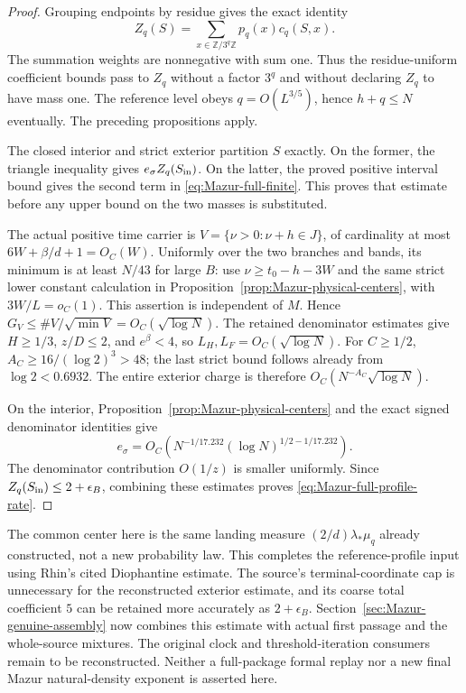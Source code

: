 \begin{proof}
Grouping endpoints by residue gives the exact identity
\[
 Z_q(S)=\sum_{x\in\mathbb Z/3^q\mathbb Z}p_q(x)c_q(S,x).
\]
The summation weights are nonnegative with sum one. Thus the
residue-uniform coefficient bounds pass to $Z_q$ without a factor
$3^q$ and without declaring $Z_q$ to have mass one.
The reference level obeys $q=O(L^{3/5})$, hence $h+q\le N$
eventually. The preceding propositions apply.

The closed interior and strict exterior partition $S$ exactly.
On the former, the triangle inequality gives $e_\sigma Z_q(S_{\rm in})$.
On the latter, the proved positive interval bound gives the second
term in \eqref{eq:Mazur-full-finite}. This proves that estimate
before any upper bound on the two masses is substituted.

The actual positive time carrier is
$V=\{\nu>0:\nu+h\in J\}$, of cardinality at most
$6W+\beta/d+1=O_C(W)$.
Uniformly over the two branches and bands, its minimum is at least
$N/43$ for large $B$: use
$\nu\ge t_0-h-3W$ and the same strict lower constant calculation
in Proposition~\ref{prop:Mazur-physical-centers}, with $3W/L=o_C(1)$.
This assertion is independent of $M$.
Hence $G_V\le\#V/\sqrt{\min V}=O_C(\sqrt{\log N})$.
The retained denominator estimates give $H\ge1/3$, $z/D\le2$,
and $e^\beta<4$, so $L_H,L_F=O_C(\sqrt{\log N})$.
For $C\ge1/2$, $A_C\ge16/(\log2)^3>48$; the last strict bound
follows already from $\log2<0.6932$.
The entire exterior charge is therefore
$O_C(N^{-A_C}\sqrt{\log N})$.

On the interior, Proposition~\ref{prop:Mazur-physical-centers} and
the exact signed denominator identities give
\[
 e_\sigma=O_C\!\left(N^{-1/17.232}
              (\log N)^{1/2-1/17.232}\right).
\]
The denominator contribution $O(1/z)$ is smaller uniformly.
Since $Z_q(S_{\rm in})\le2+\epsilon_B$, combining these estimates
proves \eqref{eq:Mazur-full-profile-rate}.
\end{proof}

The common center here is the same landing measure
$(2/d)\lambda_*\mu_q$ already constructed, not a new probability law.
This completes the reference-profile input using Rhin's cited
Diophantine estimate. The source's terminal-coordinate cap is unnecessary
for the reconstructed exterior estimate, and its coarse total coefficient
$5$ can be retained more accurately as $2+\epsilon_B$.
Section~\ref{sec:Mazur-genuine-assembly} now combines this estimate
with actual first passage and the whole-source mixtures. The original
clock and threshold-iteration consumers remain to be reconstructed.
Neither a full-package formal replay nor a new final Mazur
natural-density exponent is asserted here.

